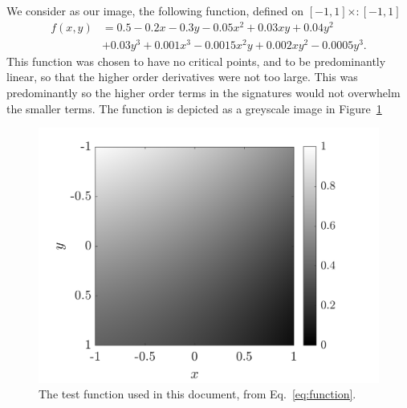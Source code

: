 \documentclass[review,onefignum,onetabnum]{siamonline190516}
\begin{document}
We consider as our image, the following function, defined on $[-1, 1]
\times:
[-1, 1]$
\begin{equation}\label{eq:function}
  \begin{split}
    f(x, y) &= 0.5 - 0.2x - 0.3y - 0.05x^2 + 0.03xy + 0.04y^2 \\ 
    &+ 0.03y^3 + 0.001x^3 - 0.0015x^2y + 0.002xy^2 - 0.0005y^3.
  \end{split}
\end{equation}
This function was chosen to have no critical points, and to be
predominantly linear, so that the higher order derivatives were not too
large. This was predominantly so the higher order terms in the signatures
would not overwhelm the smaller terms. The function is depicted as a
greyscale image in Figure~\ref{fig:function}
\begin{figure}
  \centering
  \includegraphics[width=12cm]{Figs/function}
  \caption{The test function used in this document, from
  Eq.~\eqref{eq:function}.}\label{fig:function}
\end{figure}
\end{document}
